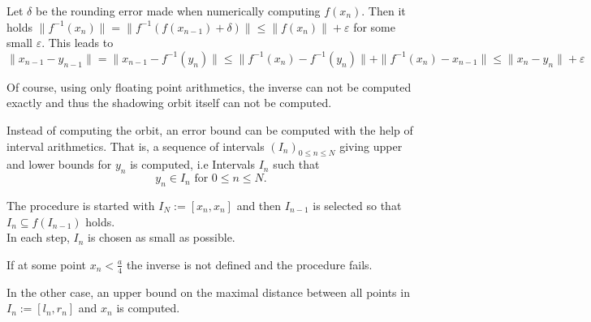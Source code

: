     Let $\delta$ be the rounding error made when numerically computing
    $f(x_n)$.
    Then it holds $\|f^{-1}(x_n)\| = \| f^{-1}(f(x_{n-1})+\delta)\| \leq \|f(x_n)\| +
    \varepsilon$ for some small $\varepsilon$.   
    This leads to
    $$ \| x_{n-1} - y_{n-1} \| = \| x_{n-1} - f^{-1}(y_n) \| \leq \|
    f^{-1}(x_n) - f^{-1}(y_n) \| + \| f^{-1}(x_n) - x_{n-1} \| \leq \| x_n -
    y_n \| + \varepsilon $$   

    Of course, using only floating point arithmetics, the inverse can not be
    computed exactly and thus the shadowing orbit itself can not be computed.

    Instead of computing the orbit, an error bound can be computed with the
    help of interval arithmetics. 
    That is, a sequence of intervals $(I_n)_{0 \leq n \leq N}$ giving upper and
    lower bounds for $y_n$ is computed, i.e Intervals $I_n$ such that
    $$y_n \in I_n \text{ for } 0 \leq n \leq N.$$

    The procedure is started with $I_N := [x_n, x_n]$ and then $I_{n-1}$ is
    selected so that $I_n \subseteq f(I_{n-1})$ holds.\\
    In each step, $I_n$ is chosen as small as possible. 

    If at some point $x_n < \frac{a}{4}$ the inverse is not defined and the
    procedure fails.
    
    In the other case, an upper bound on the maximal distance between all points in
    $I_n := [l_n, r_n]$ and $x_n$ is computed.

